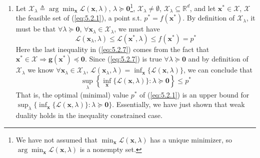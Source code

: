 \documentclass{article}
\numberwithin{equation}{section}
\begin{document}
\begin{enumerate}[label=\alph*.]
    \item
    Let $ \mathcal{X}_\lambda \triangleq
    \arg\min_\mathbf{x}\mathcal{L}(\mathbf{x}, \lambda) $,
    $ \lambda \succeq \mathbf{0} $\footnote{
        We have not assumed that
        $ \min_\mathbf{x}\mathcal{L}(\mathbf{x}, \lambda) $ has a unique
        minimizer, so $ \arg\min_\mathbf{x}\mathcal{L}(\mathbf{x}, \lambda) $
        is a nonempty set.
    }, $ \mathcal{X}_\lambda \ne \emptyset $,
    $ \mathcal{X}_\lambda \subseteq \mathbb{R}^d $, and let
    $ \mathbf{x}^* \in \mathcal{X} $, $ \mathcal{X} $ the feasible set of
    (\ref{eq:5.2.1}), a point s.t. $ p^* = f(\mathbf{x}^*) $. By definition
    of $ \mathcal{X}_\lambda $, it must be that
    $ \forall \lambda \succeq \mathbf{0} $,
    $ \forall \mathbf{x}_\lambda \in \mathcal{X}_\lambda $, we must have
    \begin{equation} \label{eq:5.2.7}
        \mathcal{L}(\mathbf{x}_\lambda, \lambda) \le
        \mathcal{L}(\mathbf{x}^*, \lambda) \le f(\mathbf{x}^*) = p^*
    \end{equation}
    Here the last inequality in (\ref{eq:5.2.7}) comes from the fact that
    $ \mathbf{x}^* \in \mathcal{X} \Rightarrow
    \mathbf{g}(\mathbf{x}^*) \preceq \mathbf{0} $. Since (\ref{eq:5.2.7}) is
    true $ \forall \lambda \succeq \mathbf{0} $ and by definition of
    $ \mathcal{X}_\lambda $ we know
    $ \forall \mathbf{x}_\lambda \in \mathcal{X}_\lambda $,
    $ \mathcal{L}(\mathbf{x}_\lambda, \lambda) =
    \inf_\mathbf{x}\{\mathcal{L}(\mathbf{x}, \lambda)\} $,
    we can conclude that
    \begin{equation} \label{eq:5.2.8}
        \sup_\lambda\left\{
            \inf_\mathbf{x}\{\mathcal{L}(\mathbf{x}, \lambda)\} :
            \lambda \succeq \mathbf{0}
        \right\} \le p^*
    \end{equation}
    That is, the optimal (minimal) value $ p^* $ of (\ref{eq:5.2.1}) is an
    upper bound for $ \sup_\lambda\{\inf_\mathbf{x}\{\mathcal{L}(\mathbf{x},
    \lambda)\} : \lambda \succeq \mathbf{0}\} $. Essentially, we have just
    shown that weak duality holds in the inequality constrained case.

\end{enumerate}
\end{document}
